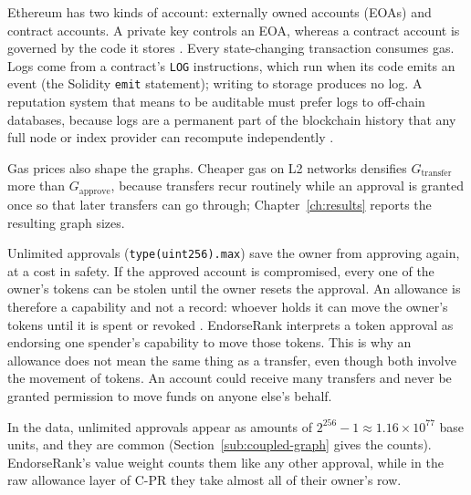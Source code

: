 
Ethereum has two kinds of account: externally owned accounts (EOAs) and contract accounts. A private key controls an EOA, whereas a contract account is governed by the code it stores . Every state-changing transaction consumes gas. Logs come from a contract's \texttt{LOG} instructions, which run when its code emits an event (the Solidity \texttt{emit} statement); writing to storage produces no log. A reputation system that means to be auditable must prefer logs to off-chain databases, because logs are a permanent part of the blockchain history that any full node or index provider can recompute independently .

Gas prices also shape the graphs. Cheaper gas on L2 networks densifies $G_{\text{transfer}}$ more than $G_{\text{approve}}$, because transfers recur routinely while an approval is granted once so that later transfers can go through; Chapter~\ref{ch:results} reports the resulting graph sizes.


Unlimited approvals (\texttt{type(uint256).max}) save the owner from approving again, at a cost in safety. If the approved account is compromised, every one of the owner's tokens can be stolen until the owner resets the approval. An allowance is therefore a capability and not a record: whoever holds it can move the owner's tokens until it is spent or revoked . EndorseRank interprets a token approval as endorsing one spender's capability to move those tokens. This is why an allowance does not mean the same thing as a transfer, even though both involve the movement of tokens. An account could receive many transfers and never be granted permission to move funds on anyone else's behalf.

In the data, unlimited approvals appear as amounts of $2^{256}-1\approx1.16\times10^{77}$ base units, and they are common (Section~\ref{sub:coupled-graph} gives the counts). EndorseRank's value weight counts them like any other approval, while in the raw allowance layer of C-PR they take almost all of their owner's row.


